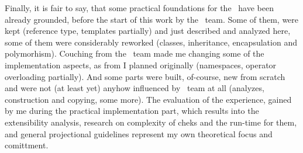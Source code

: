 Finally, it is fair to say, that some practical foundations for the \pcpp\ have been already grounded, before the start of
this work by the \mbdr\ team. Some of them, were kept (reference type, templates partially) and just described and analyzed 
here, some of them were considerably reworked (classes, inheritance, encapsulation and polymorhism). 
Couching from the \mbdr\ team made me changing some of the implementation aspects, as from I planned originally (namespaces,
operator overloading partially). And some parts were built, of-course, new from scratch and were not (at least yet) anyhow
influenced by \mbdr\ team at all (analyzes, construction and copying, some more). The evaluation of the experience, gained
by me during the practical implementation part, which results into the extensibility analysis, research on complexity of
cheks and the run-time for them, and general projectional guidelines represent my own theoretical focus and comittment.